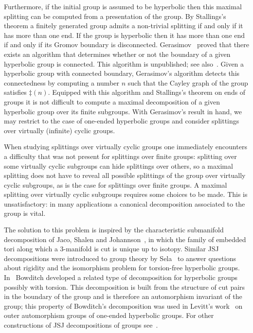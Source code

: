 Furthermore, if the initial group is assumed to be hyperbolic then this maximal splitting can be computed from a presentation of the group.
By Stallings's theorem a finitely generated group admits a non-trivial splitting if and only if it has more than one end.
If the group is hyperbolic then it has more than one end if and only if its Gromov boundary is disconnected.
Gerasimov~\cite{gerasimov} proved that there exists an algorithm that determines whether or not the boundary of a given hyperbolic group is connected. 
This algorithm is unpublished; see also~\cite{dahmanigroves08a}. 
Given a hyperbolic group with connected boundary, Gerasimov's algorithm detects this connectedness by computing a number $n$ such that the Cayley graph of the group satisfies $\ddag(n)$.
Equipped with this algorithm and Stallings's theorem on ends of groups it is not difficult to compute a maximal decomposition of a given hyperbolic group over its finite subgroups. 
With Gerasimov's result in hand, we may restrict to the case of one-ended hyperbolic groups and consider splittings over virtually (infinite) cyclic groups.

When studying splittings over virtually cyclic groups one immediately encounters a difficulty that was not present for splittings over finite groups: splitting over some virtually cyclic subgroups can hide splittings over others, so a maximal splitting does not have to reveal all possible splittings of the group over virtually cyclic subgroups, as is the case for splittings over finite groups.
A maximal splitting over virtually cyclic subgroups requires some choices to be made.
This is unsatisfactory: in many applications a canonical decomposition associated to the group is vital.

The solution to this problem is inspired by the characteristic submanifold decomposition of Jaco, Shalen and Johannson~\cite{jacoshalen79,johannson79}, in which the family of embedded tori along which a 3-manifold is cut is unique up to isotopy.
Similar JSJ decompositions were introduced to group theory by Sela~\cite{sela97} to answer questions about rigidity and the isomorphism problem for torsion-free hyperbolic groups. 
In~\cite{bowditch98} Bowditch developed a related type of decomposition for hyperbolic groups possibly with torsion. 
This decomposition is built from the structure of cut pairs in the boundary of the group and is therefore an automorphism invariant of the group; this property of Bowditch's decomposition was used in Levitt's work~\cite{levitt05} on outer automorphism groups of one-ended hyperbolic groups. 
For other constructions of JSJ decompositions of groups see~\cite{ripssela97,dunwoodysageev99,fujiwarapapsoglu06}. 

